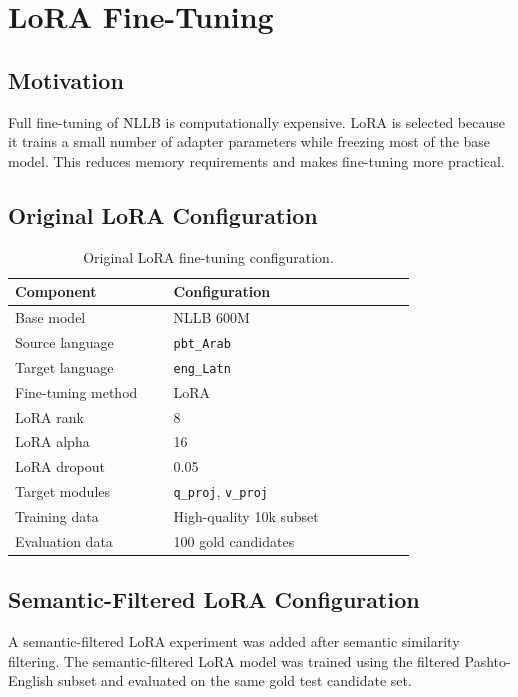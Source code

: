 \documentclass[conference]{IEEEtran}
\begin{document}
\section{LoRA Fine-Tuning}

\subsection{Motivation}

Full fine-tuning of NLLB is computationally expensive. LoRA is selected because it trains a small number of adapter parameters while freezing most of the base model. This reduces memory requirements and makes fine-tuning more practical.

\subsection{Original LoRA Configuration}

\begin{table}[H]
\centering
\caption{Original LoRA fine-tuning configuration.}
\footnotesize
\begin{tabular}{p{0.34\linewidth}p{0.52\linewidth}}
\toprule
\textbf{Component} & \textbf{Configuration} \\
\midrule
Base model & NLLB 600M \\
Source language & \texttt{pbt\_Arab} \\
Target language & \texttt{eng\_Latn} \\
Fine-tuning method & LoRA \\
LoRA rank & 8 \\
LoRA alpha & 16 \\
LoRA dropout & 0.05 \\
Target modules & \texttt{q\_proj}, \texttt{v\_proj} \\
Training data & High-quality 10k subset \\
Evaluation data & 100 gold candidates \\
\bottomrule
\end{tabular}
\end{table}

\subsection{Semantic-Filtered LoRA Configuration}

A semantic-filtered LoRA experiment was added after semantic similarity filtering. The semantic-filtered LoRA model was trained using the filtered Pashto-English subset and evaluated on the same gold test candidate set.
\end{document}
